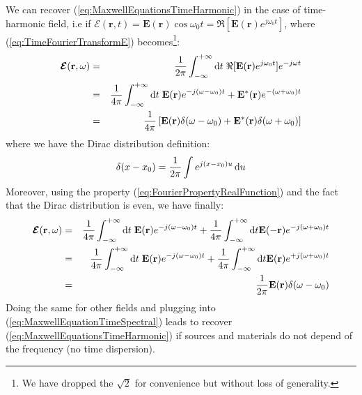 We can recover (\ref{eq:MaxwellEquationsTimeHarmonic}) in the case of time-harmonic field, i.e if $\boldsymbol{\mathcal{E}}(\mathbf{r}, t) = \mathbf{E}(\mathbf{r})\cos\omega_0 t=\Re[\mathbf{E}(\mathbf{r})e^{j\omega_0 t}]$, where (\ref{eq:TimeFourierTransformE}) becomes\footnote{We have dropped the $\sqrt{2}$ for convenience but without loss of generality.}:
\begin{eqnarray}
\boldsymbol{\mathcal{E}}(\mathbf{r},\omega) 
	&=&  
	\frac{1}{2\pi}\int_{-\infty}^{+\infty} \mathop{}\!\mathrm{d} t \;
	\Re[\mathbf{E}(\mathbf{r})e^{j\omega_0 t}]
	e^{-j\omega t} 
	\nonumber
	\\
	&=&  
	\frac{1}{4\pi}\int_{-\infty}^{+\infty} \mathop{}\!\mathrm{d} t \;
	\mathbf{E}(\mathbf{r}) e^{-j(\omega-\omega_0 ) t}
	+
	\mathbf{E}^*(\mathbf{r}) e^{-(\omega+\omega_0 ) t} 
	\nonumber
	\\
	&=&
	\frac{1}{4\pi} \left[
	\mathbf{E}(\mathbf{r}) \delta(\omega - \omega_0) 
	+
	\mathbf{E}^*(\mathbf{r}) \delta(\omega + \omega_0)  
	\right]
	\nonumber
\end{eqnarray}
where we have the Dirac distribution definition:
\begin{eqnarray}
\delta(x - x_0) 
= \frac{1}{2\pi}
\int
e^{j (x-x_0) u} \mathop{}\!\mathrm{d} u
\label{eq:DiracDefinition}
\end{eqnarray}
Moreover, using the property (\ref{eq:FourierPropertyRealFunction}) and the fact that the Dirac distribution is even, we have finally:
\begin{eqnarray}
\boldsymbol{\mathcal{E}}(\mathbf{r},\omega) 
&=&
\frac{1}{4\pi}\int_{-\infty}^{+\infty} \mathop{}\!\mathrm{d} t \;
\mathbf{E}(\mathbf{r}) e^{-j(\omega-\omega_0 ) t}
+
\frac{1}{4\pi}\int_{-\infty}^{+\infty} \mathop{}\!\mathrm{d} t
\mathbf{E}(-\mathbf{r}) e^{-j(\omega+\omega_0 ) t} 
\nonumber
\\
&=&
\frac{1}{4\pi}\int_{-\infty}^{+\infty} \mathop{}\!\mathrm{d} t \;
\mathbf{E}(\mathbf{r}) e^{-j(\omega-\omega_0 ) t}
+
\frac{1}{4\pi}\int_{-\infty}^{+\infty} \mathop{}\!\mathrm{d} t
\mathbf{E}(\mathbf{r}) e^{+j(\omega+\omega_0 ) t} 
\nonumber
\\
&=&
\frac{1}{2\pi}
\mathbf{E}(\mathbf{r}) \delta(\omega - \omega_0) 
\end{eqnarray}
Doing the same for other fields and plugging into (\ref{eq:MaxwellEquationTimeSpectral}) leads to recover (\ref{eq:MaxwellEquationsTimeHarmonic}) if sources and materials do not depend of the frequency (no time dispersion). 


